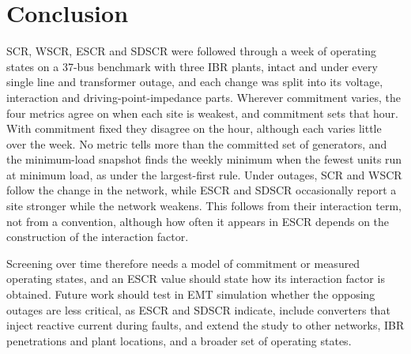 \section{Conclusion}
\label{sec:conclusion}

SCR, WSCR, ESCR and SDSCR were followed through a week of operating states on a 37-bus benchmark
with three IBR plants, intact and under every single line and transformer outage, and each
change was split into its voltage, interaction and driving-point-impedance parts. Wherever
commitment varies, the four metrics agree on when each site is weakest, and commitment sets that
hour. With commitment fixed they disagree on the hour, although each varies little over the
week. No metric tells more than the committed set of generators, and the
minimum-load snapshot finds the weekly minimum when the fewest units run at minimum load, as under the
largest-first rule.
Under outages, SCR and WSCR follow the change in the network, while ESCR and SDSCR occasionally
report a site stronger while the network weakens. This follows from their interaction term, not
from a convention, although how often it appears in ESCR depends on the construction of the
interaction factor.

Screening over time therefore needs a model of commitment or measured operating states, and an
ESCR value should state how its interaction factor is obtained. Future work should test in EMT
simulation whether the opposing outages are less critical, as ESCR and SDSCR indicate, include converters that inject
reactive current during faults, and extend the study to other networks, IBR penetrations and
plant locations, and a broader set of operating states.
